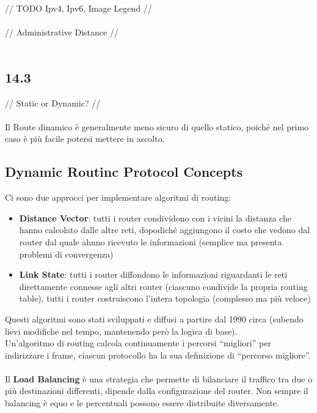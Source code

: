 \documentclass[12pt, a4paper]{article}
\begin{document}
	// TODO Ipv4, Ipv6, Image Legend // \\ \\
	
	// Administrative Distance // \\ \\
	
	
	\subsection*{14.3 }
	
	// Static or Dynamic? // \\ \\
	
	Il Route dinamico è generalmente meno sicuro di quello statico, poiché nel primo caso è più facile potersi mettere in ascolto.  \\
	
	\subsection*{Dynamic Routinc Protocol Concepts} 
	Ci sono due approcci per implementare algoritmi di routing:
	\begin{itemize}
		\item \textbf{Distance Vector}: tutti i router condividono con i vicini la distanza che hanno calcolato dalle altre reti, dopodiché aggiungono il costo che vedono dal router dal quale ahnno ricevuto le informazioni (semplice ma presenta problemi di convergenza)
		\item \textbf{Link State}: tutti i router diffondono le informazioni riguardanti le reti direttamente connesse agli altri router (ciascuno condivide la propria routing table), tutti i router costruiscono l'intera topologia (complesso ma più veloce)
	\end{itemize}
	Questi algoritmi sono stati sviluppati e diffusi a partire dal 1990 circa (subendo lievi modifiche nel tempo, mantenendo però la logica di base). \\
	Un'algoritmo di routing calcola continuamente i percorsi ``migliori'' per indirizzare i frame, ciascun protocollo ha la sua definizione di ``percorso migliore''. \\ \\
	Il \textbf{Load Balancing} è una strategia che permette di bilanciare il traffico tra due o più destinazioni differenti, dipende dalla configurazione del router. Non sempre il balancing è equo e le percentuali possono essere distribuite diversamente.
	
\end{document}
